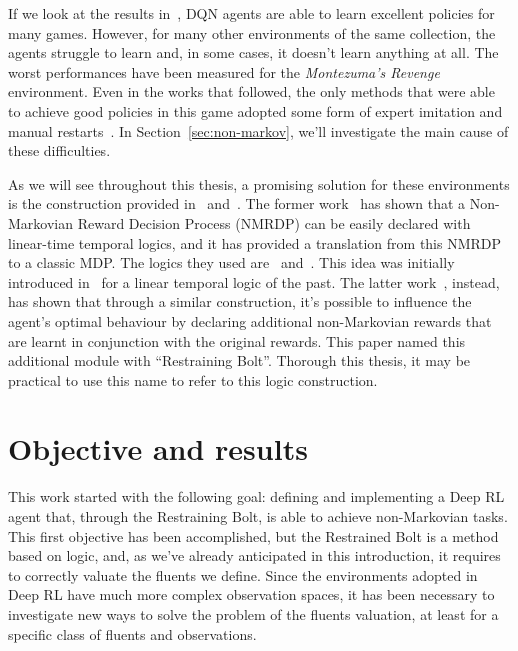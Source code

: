 If we look at the results in~\cite{bib:atari-deepq-nature}, DQN agents are
able to learn excellent policies for many games. However, for many other
environments of the same collection, the agents struggle to learn and, in some
cases, it doesn't learn anything at all. The worst performances have been
measured for the \emph{Montezuma's Revenge} environment. Even in the works
that followed, the only methods that were able to achieve good policies in
this game adopted some form of expert imitation and manual
restarts~\cite{bib:mz-openai-demonstrations}. In Section~\ref{sec:non-markov},
we'll investigate the main cause of these difficulties.

As we will see throughout this thesis, a promising solution for these
environments is the construction provided in~\cite{bib:degiacomo-logic-nmrdp}
and~\cite{bib:bolt}. The former work~\cite{bib:degiacomo-logic-nmrdp} has
shown that a Non-Markovian Reward Decision Process (NMRDP) can be easily
declared with linear-time temporal logics, and it has provided a translation
from this NMRDP to a classic MDP. The logics they used are~\ltl{} and~\ldl{}.
This idea was initially introduced in~\cite{bib:nmrdp-logic-first} for a
linear temporal logic of the past. The latter work~\cite{bib:bolt}, instead,
has shown that through a similar construction, it's possible to influence the
agent's optimal behaviour by declaring additional non-Markovian rewards that
are learnt in conjunction with the original rewards. This paper named this
additional module with ``Restraining Bolt''.  Thorough this thesis, it may be
practical to use this name to refer to this logic construction.


\section{Objective and results}

\label{sec:intro-objective}

This work started with the following goal: defining and implementing a Deep RL
agent that, through the Restraining Bolt, is able to achieve non-Markovian
tasks. This first objective has been accomplished, but the Restrained Bolt is
a method based on logic, and, as we've already anticipated in this
introduction, it requires to correctly valuate the fluents we define. Since
the environments adopted in Deep RL have much more complex observation spaces,
it has been necessary to investigate new ways to solve the problem of the
fluents valuation, at least for a specific class of fluents and observations.

